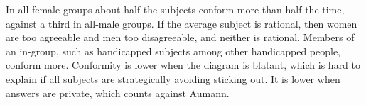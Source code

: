 In all-female groups about half the subjects conform more than half the time, against a third in all-male groups. If the average subject is rational, then women are too agreeable and men too disagreeable, and neither is rational. Members of an in-group, such as handicapped subjects among other handicapped people, conform more. Conformity is lower when the diagram is blatant, which is hard to explain if all subjects are strategically avoiding sticking out. It is lower when answers are private, which counts against Aumann.

